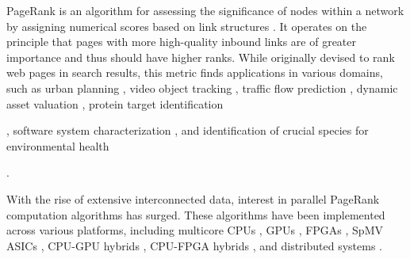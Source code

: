 PageRank is an algorithm for assessing the significance of nodes within a network by assigning numerical scores based on link structures \cite{rank-page99}. It operates on the principle that pages with more high-quality inbound links are of greater importance and thus should have higher ranks. While originally devised to rank web pages in search results, this metric finds applications in various domains, such as urban planning \cite{urban-zhang18}, video object tracking \cite{gong2013pagerank}, traffic flow prediction \cite{traffic-kim15}, dynamic asset valuation \cite{sawilla2006abstracting}, protein target identification \cite{banky2013equal}, software system characterization \cite{chepelianskii2010towards}, and identification of crucial species for environmental health \cite{allesina2009googling}.

With the rise of extensive interconnected data, interest in parallel PageRank computation algorithms has surged. These algorithms have been implemented across various platforms, including multicore CPUs \cite{rank-garg16, rank-beamer17, rank-lakhotia18, grutzmacher2020acceleration, huang2020accelerating, chen2021hipa}, GPUs \cite{duong2012parallel, rank-nvgraph, grutzmacher2018high, piccinotti2019solving, grutzmacher2020acceleration, kang2020computing, concessao2023meerkat}, FPGAs \cite{rank-guoqiang20}, SpMV ASICs \cite{rank-sadi18}, CPU-GPU hybrids \cite{rank-giri20}, CPU-FPGA hybrids \cite{usta2020accelerating, rank-li21, rank-hassan21, rank-mughrabi21}, and distributed systems \cite{rank-sarma13, kang2022analyzing, vandromme2022scaling}.


